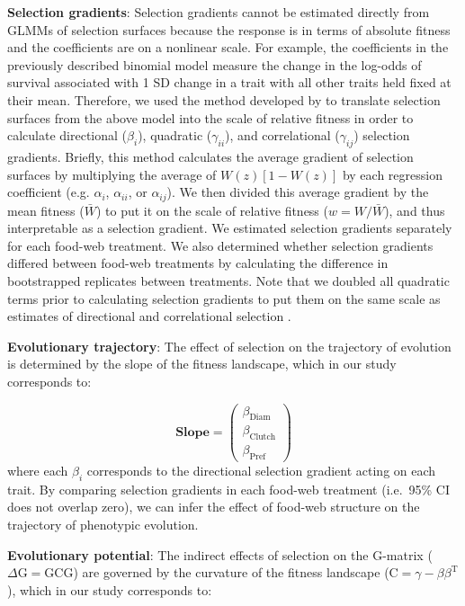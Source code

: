\documentclass[11pt,]{article}
\begin{document}
\textbf{Selection gradients}: Selection gradients cannot be estimated
directly from GLMMs of selection surfaces because the response is in
terms of absolute fitness and the coefficients are on a nonlinear scale.
For example, the coefficients in the previously described binomial model
measure the change in the log-odds of survival associated with 1 SD
change in a trait with all other traits held fixed at their mean.
Therefore, we used the method developed by \citet{Janzen1998} to
translate selection surfaces from the above model into the scale of
relative fitness in order to calculate directional (\(\beta_i\)),
quadratic (\(\gamma_{ii}\)), and correlational (\(\gamma_{ij}\))
selection gradients. Briefly, this method calculates the average
gradient of selection surfaces by multiplying the average of
\(W(z)[1-W(z)]\) by each regression coefficient (e.g. \(\alpha_i\),
\(\alpha_{ii}\), or \(\alpha_{ij}\)). We then divided this average
gradient by the mean fitness (\(\bar W\)) to put it on the scale of
relative fitness (\(w=W/\bar W\)), and thus interpretable as a selection
gradient. We estimated selection gradients separately for each food-web
treatment. We also determined whether selection gradients differed
between food-web treatments by calculating the difference in
bootstrapped replicates between treatments. Note that we doubled all
quadratic terms prior to calculating selection gradients to put them on
the same scale as estimates of directional and correlational selection
\citep{Stinchcombe2008}.

\textbf{Evolutionary trajectory}: The effect of selection on the
trajectory of evolution is determined by the slope of the fitness
landscape, which in our study corresponds to:

\[\textbf{Slope} = \begin{pmatrix} \beta_{\text{Diam}} \\ \beta_{\text{Clutch}} \\ \beta_{\text{Pref}} \end{pmatrix} \]
where each \(\beta_i\) corresponds to the directional selection gradient
acting on each trait. By comparing selection gradients in each food-web
treatment (i.e.~95\% CI does not overlap zero), we can infer the effect
of food-web structure on the trajectory of phenotypic evolution.

\textbf{Evolutionary potential}: The indirect effects of selection on
the G-matrix (\(\Delta\text{G}=\text{G}\text{C}\text{G}\)) are governed
by the curvature of the fitness landscape
(\(\text{C}=\gamma - \beta \beta^\text{T}\)), which in our study
corresponds to:
\end{document}
